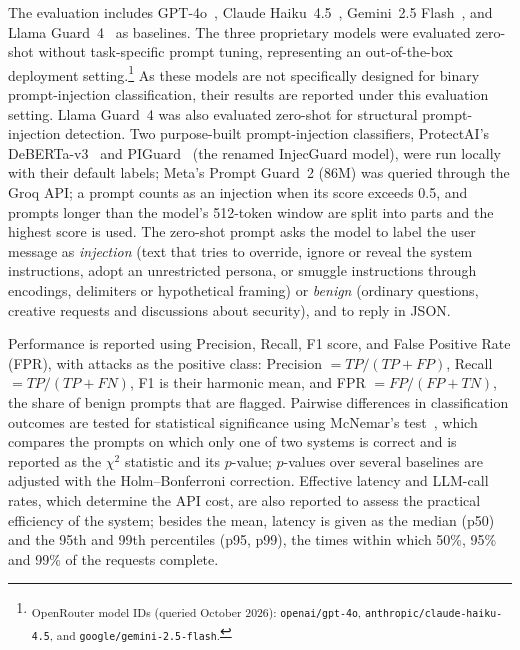 \documentclass[runningheads]{llncs}
\newif\ifrev
\newcommand{\rev}[1]{\ifrev\hl{#1}\else#1\fi}                  %
\begin{document}
The evaluation includes GPT-4o~\cite{gpt4o}, \rev{Claude Haiku~4.5~\cite{claudehaiku45}}, Gemini~2.5 Flash~\cite{gemini25},
and Llama Guard~4~\cite{llamaguard4} as baselines. \rev{The three proprietary} models were evaluated
zero-shot without task-specific prompt tuning, representing an
out-of-the-box deployment setting.\footnote{\scriptsize\textsubscript{\rev{OpenRouter model IDs (queried October 2026):} \texttt{\rev{openai/gpt-4o}},
\texttt{\rev{anthropic/claude-haiku-4.5}}, and
\texttt{\rev{google/gemini-2.5-flash}}.}}
As these models are not specifically designed for binary
prompt-injection classification, their results are reported under this
evaluation setting. Llama Guard~4 was also evaluated zero-shot for
structural prompt-injection detection. \rev{Two purpose-built prompt-injection classifiers, ProtectAI's DeBERTa-v3~\cite{protectaideberta} and PIGuard~\cite{injecguard} (the renamed InjecGuard model), were run locally with their default labels; Meta's Prompt Guard~2 (86M) was queried through the Groq API; a prompt counts as an injection when its score exceeds 0.5, and prompts longer than the model's 512-token window are split into parts and the highest score is used. The zero-shot prompt asks the model to label the user message as \emph{injection} (text that tries to override, ignore or reveal the system instructions, adopt an unrestricted persona, or smuggle instructions through encodings, delimiters or hypothetical framing) or \emph{benign} (ordinary questions, creative requests and discussions about security), and to reply in JSON.}

Performance is reported using Precision, Recall, F1 score, and False
Positive Rate (FPR)\rev{, with attacks as the positive class: Precision $=\mathit{TP}/(\mathit{TP}+\mathit{FP})$, Recall $=\mathit{TP}/(\mathit{TP}+\mathit{FN})$, F1 is their harmonic mean, and FPR $=\mathit{FP}/(\mathit{FP}+\mathit{TN})$, the share of benign prompts that are flagged}. Pairwise differences in classification outcomes
are tested for statistical significance using McNemar's
test~\cite{McNemar}\rev{, which compares the prompts on which only one of two systems is correct and is reported as the $\chi^2$ statistic and its $p$-value; $p$-values over several baselines are adjusted with the Holm--Bonferroni correction}. Effective latency and \rev{LLM-call rates, which determine the API cost,} are also
reported to assess the practical efficiency of the system\rev{; besides the mean, latency is given as the median (p50) and the 95th and 99th percentiles (p95, p99), the times within which 50\%, 95\% and 99\% of the requests complete}.
\end{document}

